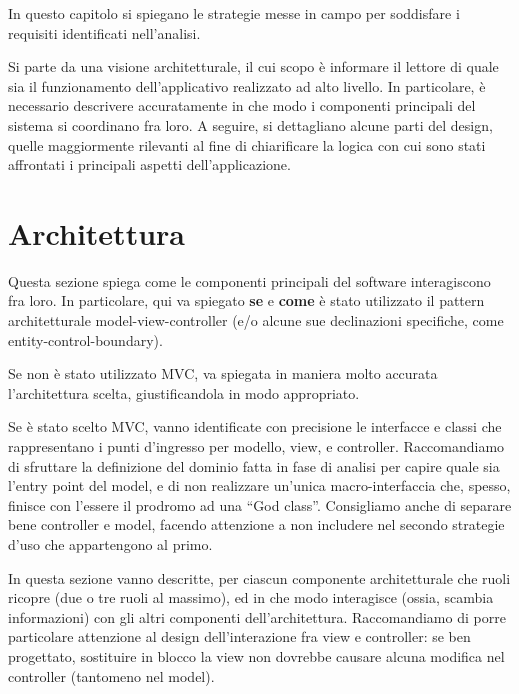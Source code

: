 \documentclass[a4paper,12pt]{report}
\begin{document}
In questo capitolo si spiegano le strategie messe in campo per soddisfare i requisiti identificati nell'analisi.

Si parte da una visione architetturale, il cui scopo è informare il lettore di quale sia il funzionamento dell'applicativo realizzato ad alto livello.
%
In particolare, è necessario descrivere accuratamente in che modo i componenti principali del sistema si coordinano fra loro.
%
A seguire, si dettagliano alcune parti del design, quelle maggiormente rilevanti al fine di chiarificare la logica con cui sono stati affrontati i principali aspetti dell'applicazione.

\section{Architettura}

Questa sezione spiega come le componenti principali del software interagiscono fra loro.
%
In particolare, qui va spiegato \textbf{se} e \textbf{come} è stato utilizzato il pattern
architetturale model-view-controller (e/o alcune sue declinazioni specifiche, come entity-control-boundary).

Se non è stato utilizzato MVC, va spiegata in maniera molto accurata l'architettura scelta, giustificandola in modo appropriato.

Se è stato scelto MVC, vanno identificate con precisione le interfacce e classi che rappresentano i punti d'ingresso per modello, view, e controller.
Raccomandiamo di sfruttare la definizione del dominio fatta in fase di analisi per capire quale sia l'entry point del model, e di non realizzare un'unica macro-interfaccia che, spesso, finisce con l'essere il prodromo ad una ``God class''.
%
Consigliamo anche di separare bene controller e model, facendo attenzione a non includere nel secondo strategie d'uso che appartengono al primo.

In questa sezione vanno descritte, per ciascun componente architetturale che ruoli ricopre (due o tre ruoli al massimo), ed in che modo interagisce (ossia, scambia informazioni) con gli altri componenti dell'architettura.
%
Raccomandiamo di porre particolare attenzione al design dell'interazione fra view e controller: se ben progettato, sostituire in blocco la view non dovrebbe causare alcuna modifica nel controller (tantomeno nel model).
\end{document}
